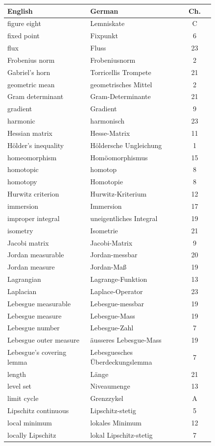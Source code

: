 \begin{center}
\begin{tabular}{@{}p{0.40\linewidth} p{0.44\linewidth} c@{}}
\textbf{English} & \textbf{German} & \textbf{Ch.} \\
\hline
figure eight & Lemniskate & C \\
fixed point & Fixpunkt & 6 \\
flux & Fluss & 23 \\
Frobenius norm & Frobeniusnorm & 2 \\
Gabriel's horn & Torricellis Trompete & 21 \\
geometric mean & geometrisches Mittel & 2 \\
Gram determinant & Gram-Determinante & 21 \\
gradient & Gradient & 9 \\
harmonic & harmonisch & 23 \\
Hessian matrix & Hesse-Matrix & 11 \\
Hölder's inequality & Höldersche Ungleichung & 1 \\
homeomorphism & Homöomorphismus & 15 \\
homotopic & homotop & 8 \\
homotopy & Homotopie & 8 \\
Hurwitz criterion & Hurwitz-Kriterium & 12 \\
immersion & Immersion & 17 \\
improper integral & uneigentliches Integral & 19 \\
isometry & Isometrie & 21 \\
Jacobi matrix & Jacobi-Matrix & 9 \\
Jordan measurable & Jordan-messbar & 20 \\
Jordan measure & Jordan-Maß & 19 \\
Lagrangian & Lagrange-Funktion & 13 \\
Laplacian & Laplace-Operator & 23 \\
Lebesgue measurable & Lebesgue-messbar & 19 \\
Lebesgue measure & Lebesgue-Mass & 19 \\
Lebesgue number & Lebesgue-Zahl & 7 \\
Lebesgue outer measure & äusseres Lebesgue-Mass & 19 \\
Lebesgue's covering lemma & Lebesguesches Überdeckungslemma & 7 \\
length & Länge & 21 \\
level set & Niveaumenge & 13 \\
limit cycle & Grenzzykel & A \\
Lipschitz continuous & Lipschitz-stetig & 5 \\
local minimum & lokales Minimum & 12 \\
locally Lipschitz & lokal Lipschitz-stetig & 7 \\
\end{tabular}
\end{center}

